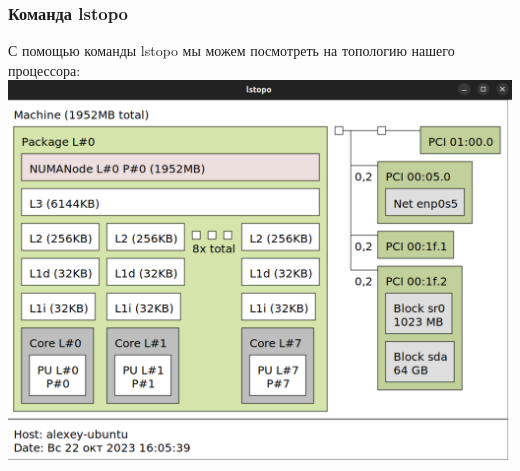 \documentclass[12pt,onecolumn]{article}
\begin{document}
\subsubsection{Команда lstopo}
С помощью команды lstopo мы можем посмотреть на топологию нашего процессора:\\
\includegraphics[width=\textwidth]{image/lstopo.png}
\end{document}
